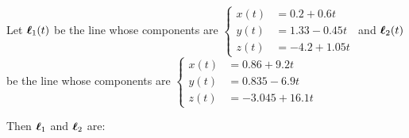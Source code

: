 \documentclass{ximera}
\author{Gregory Hartman \and Matthew Carr}
\begin{document}
\begin{exercise}




Let $\boldsymbol{\ell}_{1}(t)$ be the line whose components are $\left\{ \begin{aligned}
x(t) & =0.2+0.6t\\
y(t) & =1.33-0.45t\\
z(t) & =-4.2+1.05t
\end{aligned}
\right.$  and $\boldsymbol{\ell}_{2}(t)$ be the line whose components are $\left\{ \begin{aligned}
x(t) & =0.86+9.2t\\
y(t) & =0.835-6.9t\\
z(t) & =-3.045+16.1t
\end{aligned}
\right.$

Then $\boldsymbol{\ell}_{1}$ and $\boldsymbol{\ell}_{2}$ are: 

\begin{multipleChoice}
\end{multipleChoice}


\end{exercise}
\end{document}
